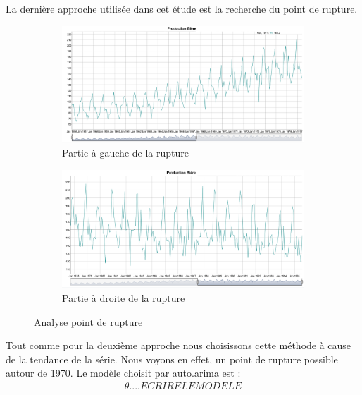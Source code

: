 \documentclass[12pt,a4paper]{book}
\newcommand{\1}{\mathds{1}}
\begin{document}
La dernière approche utilisée dans cet étude est la recherche du point de rupture. 
\begin{figure}[h]
	\begin{subfigure}{.5\textwidth}
  		\centering
    	\includegraphics[scale=0.2]{rupture1}  
    	\caption{Partie à gauche de la rupture}
    	\label{fig:sub1}
    \end{subfigure}
    \begin{subfigure}{.5\textwidth}
    	\centering
    	\includegraphics[scale=0.2]{rupture2}  
    	\caption{Partie à droite de la rupture}
    	\label{fig:sub2}
    \end{subfigure}

\caption{Analyse point de rupture}
\label{fig:1}
   
\end{figure}

Tout comme pour la deuxième approche nous choisissons cette méthode à cause de la tendance de la série. Nous voyons en effet, un point de rupture possible autour de 1970. Le modèle choisit par auto.arima est :
\begin{align*}
\theta ....ECRIRE LE MODELE
\end{align*}
\end{document}
